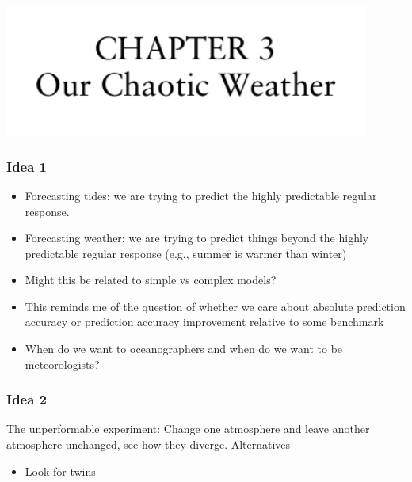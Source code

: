 \documentclass[aspectratio=169]{beamer}
\begin{document}
\begin{frame}

\begin{center}
\includegraphics[width = 0.9\textwidth]{figures/lorenz_essence_1993_ch3}
\end{center}

\end{frame}
\begin{frame}
\frametitle{Idea 1}

\begin{itemize}
\item Forecasting tides: we are trying to predict the highly predictable regular response. 
\pause
\item Forecasting weather: we are trying to predict things beyond the highly predictable regular response (e.g., summer is warmer than winter)
\end{itemize}
\pause 
\vfill

\begin{itemize}
\item Might this be related to simple vs complex models? 
\pause
\item This reminds me of the question of whether we care about absolute prediction accuracy or prediction accuracy improvement relative to some benchmark
\pause
\item When do we want to oceanographers and when do we want to be meteorologists?
\end{itemize}

\end{frame}
\begin{frame}
\frametitle{Idea 2}

The unperformable experiment: Change one atmosphere and leave another atmosphere unchanged, see how they diverge. Alternatives
\begin{itemize}
\item Look for twins
\end{itemize}

\end{frame}
\end{document}
